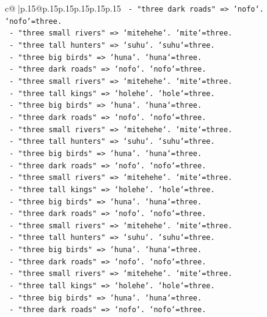 \documentclass{article}
\begin{document}
{\begin{supertabular}{c@{$\;$}|p{.15\linewidth}@{}p{.15\linewidth}p{.15\linewidth}p{.15\linewidth}p{.15\linewidth}p{.15\linewidth}}
{{{\texttt{      {-} "three dark roads" => `nofo`. `nofo`=three.} \\
\texttt{      {-} "three small rivers" => `mitehehe`. `mite`=three.} \\
\texttt{      {-} "three tall hunters" => `suhu`. `suhu`=three.} \\
\texttt{      {-} "three big birds" => `huna`. `huna`=three.} \\
\texttt{      {-} "three dark roads" => `nofo`. `nofo`=three.} \\
\texttt{      {-} "three small rivers" => `mitehehe`. `mite`=three.} \\
\texttt{      {-} "three tall kings" => `holehe`. `hole`=three.} \\
\texttt{      {-} "three big birds" => `huna`. `huna`=three.} \\
\texttt{      {-} "three dark roads" => `nofo`. `nofo`=three.} \\
\texttt{      {-} "three small rivers" => `mitehehe`. `mite`=three.} \\
\texttt{      {-} "three tall hunters" => `suhu`. `suhu`=three.} \\
\texttt{      {-} "three big birds" => `huna`. `huna`=three.} \\
\texttt{      {-} "three dark roads" => `nofo`. `nofo`=three.} \\
\texttt{      {-} "three small rivers" => `mitehehe`. `mite`=three.} \\
\texttt{      {-} "three tall kings" => `holehe`. `hole`=three.} \\
\texttt{      {-} "three big birds" => `huna`. `huna`=three.} \\
\texttt{      {-} "three dark roads" => `nofo`. `nofo`=three.} \\
\texttt{      {-} "three small rivers" => `mitehehe`. `mite`=three.} \\
\texttt{      {-} "three tall hunters" => `suhu`. `suhu`=three.} \\
\texttt{      {-} "three big birds" => `huna`. `huna`=three.} \\
\texttt{      {-} "three dark roads" => `nofo`. `nofo`=three.} \\
\texttt{      {-} "three small rivers" => `mitehehe`. `mite`=three.} \\
\texttt{      {-} "three tall kings" => `holehe`. `hole`=three.} \\
\texttt{      {-} "three big birds" => `huna`. `huna`=three.} \\
\texttt{      {-} "three dark roads" => `nofo`. `nofo`=three.} \\
}}}
\end{supertabular}}
\end{document}
